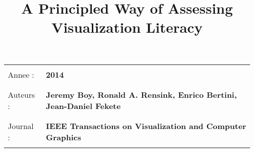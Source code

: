 \documentclass[10pt]{article}
\begin{document}
\title{A Principled Way of Assessing Visualization Literacy}
\maketitle

\begin{tabular}{| l l |}
\hline 

& \\ 
Annee : & \textbf{2014} \\
& \\ 
& \\ 
Auteurs : & \textbf{Jeremy Boy, Ronald A. Rensink, Enrico Bertini, Jean-Daniel Fekete} \\
& \\ 
& \\ 
Journal : & \textbf{IEEE Transactions on Visualization and Computer Graphics} \\
& \\ 
\hline
\end{tabular}
\end{document}
